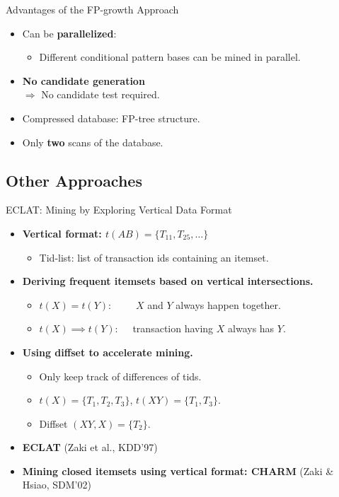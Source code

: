 \begin{frame}{Advantages of the FP-growth Approach}
	\begin{itemize}
		\item Can be \textbf{parallelized}:
		      \begin{itemize}
			      \item Different conditional pattern bases can be mined in parallel.
		      \end{itemize}
		\item \textbf{No candidate generation} \\ \hspace*{1cm} $\Rightarrow$ No candidate test required.
		\item Compressed database: FP-tree structure.
		\item Only \textbf{two} scans of the database.
	\end{itemize}
\end{frame}

\subsection{Other Approaches}

\begin{frame}{ECLAT: Mining by Exploring Vertical Data Format}
	\begin{itemize}
		\item \textbf{Vertical format: $t(AB) = \{T_{11},T_{25},\ldots\}$}
		      \begin{itemize}
			      \item Tid-list: list of transaction ids containing an itemset.
		      \end{itemize}
		\item \textbf{Deriving frequent itemsets based on vertical
			      intersections.}
		      \begin{itemize}
			      \item $t(X) = t(Y): \qquad$ \hphantom{.} $X$ and $Y$ always happen
			            together.
			      \item $t(X) \implies t(Y):\quad $ transaction having $X$ always has
			            $Y$.
		      \end{itemize}
		\item \textbf{Using diffset to accelerate mining.}
		      \begin{itemize}
			      \item Only keep track of differences of tids.
			      \item $t(X) = \{T_1,T_2,T_3\}$, $t(XY) = \{T_1,T_3\}$.
			      \item Diffset $(XY,X) = \{T_2\}$.
		      \end{itemize}
		\item \textbf{ECLAT} (Zaki et al., KDD'97)
		\item \textbf{Mining closed itemsets using vertical format: CHARM}
		      (Zaki \& Hsiao, SDM'02)
	\end{itemize}
\end{frame}

